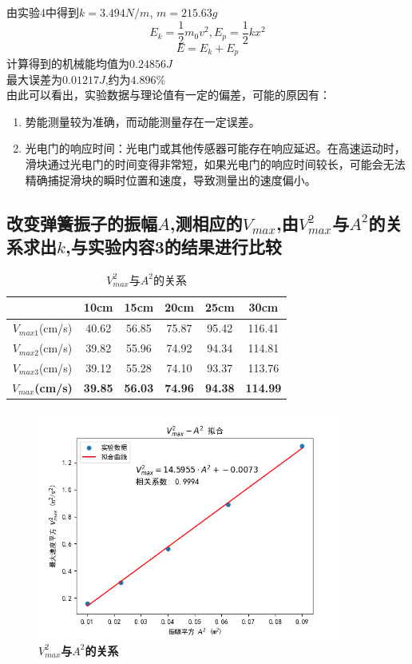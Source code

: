 \documentclass[UTF8]{article}
\theoremstyle{MyLineTheoremStyle} %
\theoremstyle{MyBlockTheoremStyle} %
\theoremstyle{MySubsubsectionStyle} %
\begin{document}
由实验4中得到$k=3.494N/m$, $m=215.63g$\\
\[
E_k=\frac{1}{2}m_0v^2, E_p=\frac{1}{2}kx^2
\]
\[
E=E_k+E_p
\]
\indent 计算得到的机械能均值为$0.24856J$\\
\indent 最大误差为$0.01217J$,约为$4.896\%$\\
\indent 由此可以看出，实验数据与理论值有一定的偏差，可能的原因有：
\begin{enumerate}
    \item 势能测量较为准确，而动能测量存在一定误差。
    \item 光电门的响应时间：光电门或其他传感器可能存在响应延迟。在高速运动时，滑块通过光电门的时间变得非常短，如果光电门的响应时间较长，可能会无法精确捕捉滑块的瞬时位置和速度，导致测量出的速度偏小。
\end{enumerate}


\subsection{改变弹簧振子的振幅$A$,测相应的$V_{max}$,由$V_{max}^2$与$A^2$的关系求出$k$,与实验内容3的结果进行比较}

\begin{table}[H]
    \centering
    \begin{tabular}{|c|c|c|c|c|c|}
        \hline
         & 10cm & 15cm & 20cm & 25cm & 30cm\\
        \hline
        $V_{max1}$(cm/s) & 40.62 & 56.85 & 75.87 & 95.42 & 116.41\\
        \hline
        $V_{max2}$(cm/s) & 39.82 & 55.96 & 74.92 & 94.34 & 114.81\\
        \hline
        $V_{max3}$(cm/s) & 39.12 & 55.28 & 74.10 & 93.37 & 113.76\\
        \hline
        \textbf{$V_{max}$(cm/s)} & \textbf{39.85} & \textbf{56.03} & \textbf{74.96} & \textbf{94.38} & \textbf{114.99}\\
        \hline			
    \end{tabular}
    \caption{\small $V_{max}^2$与$A^2$的关系}
\end{table}

\begin{figure}[H]
    \centering
    \includegraphics[width=0.9\textwidth]{Figure_4.png}
    \caption{\bfseries $V_{max}^2$与$A^2$的关系}
\end{figure}
\end{document}
